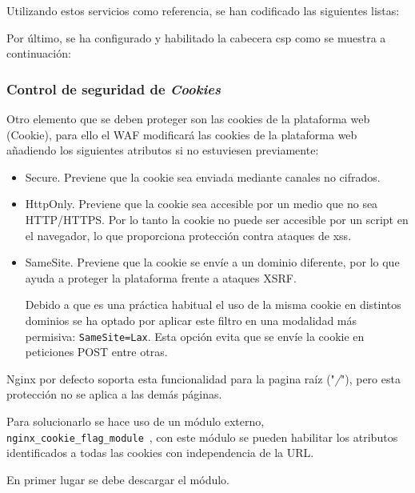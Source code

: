 \par Utilizando estos servicios como referencia, se han codificado las siguientes listas: \\
\begin{minipage}{\linewidth}
  
\end{minipage}

\par Por último, se ha configurado y habilitado la cabecera \acrshort{csp} como se muestra a continuación: \\
\begin{minipage}{\linewidth}
  
\end{minipage}

\subsubsection{Control de seguridad de {\em Cookies}}
\par Otro elemento que se deben proteger son las cookies de la plataforma web (\gls{Cookie}), para ello el WAF modificará las cookies de la plataforma web añadiendo los siguientes atributos si no estuviesen previamente:
\begin{itemize}
  \item Secure. Previene que la cookie sea enviada mediante canales no cifrados.
  \item HttpOnly. Previene que la cookie sea accesible por un medio que no sea HTTP/HTTPS. Por lo tanto la cookie no puede ser accesible por un script en el navegador, lo que proporciona protección contra ataques de
    \acrshort{xss}.
  \item SameSite. Previene que la cookie se envíe a un dominio diferente, por lo que ayuda a proteger la plataforma frente a ataques \gls{XSRF}.
    \par Debido a que es una práctica habitual el uso de la misma cookie en distintos dominios se ha optado por aplicar este filtro en una modalidad más permisiva: \lstinline{SameSite=Lax}. Esta opción evita que se envíe
    la cookie en peticiones POST entre otras.
\end{itemize}

\par Nginx por defecto soporta esta funcionalidad para la pagina raíz ("{\em /}"), pero esta protección no se aplica a las demás páginas.
\par Para solucionarlo se hace uso de un módulo externo, \lstinline{nginx_cookie_flag_module}~\cite{nginx_cookie}, con este módulo se pueden habilitar los atributos identificados a todas las cookies con independencia de la URL.
\par En primer lugar se debe descargar el módulo.
  

